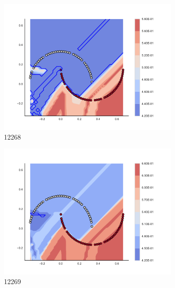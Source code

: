 \begin{figure}[h]
\begin{subfigure}[b]{0.09\textwidth}
    \includegraphics[clip, trim=2.35cm 1.75cm 4.5cm 0cm,width=\textwidth]{img/convergence/12268.pdf}
    \caption{12268}
    \label{fig:convergence_12268}
\end{subfigure}
%
\begin{subfigure}[b]{0.09\textwidth}
    \includegraphics[clip, trim=2.35cm 1.75cm 4.5cm 0cm,width=\textwidth]{img/convergence/12269.pdf}
    \caption{12269}
    \label{fig:convergence_12269}
\end{subfigure}
%
\begin{subfigure}[b]{0.09\textwidth}

\end{subfigure}
\end{figure}
